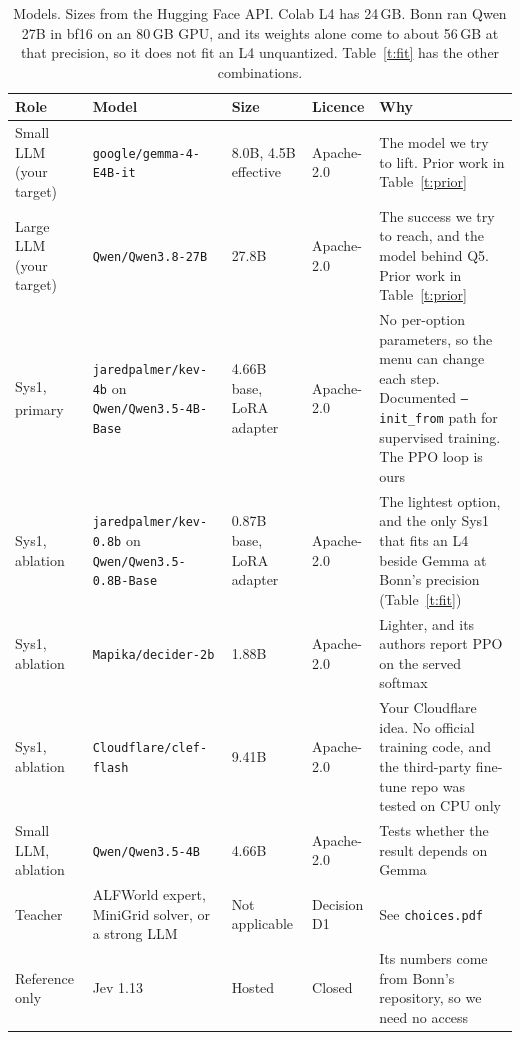 \documentclass[10pt]{article}
\newcommand{\my}{\textsuperscript{\textcolor{blue!70!black}{\dag}}}
\begin{document}
\begin{table}[H]
\footnotesize
\caption{Models. Sizes from the Hugging Face API. Colab L4 has 24\,GB. Bonn ran Qwen 27B in bf16 on an 80\,GB GPU, and its weights alone come to about 56\,GB at that precision, so it does not fit an L4 unquantized. Table~\ref{t:fit} has the other combinations.}
\label{t:models}
\begin{tabularx}{\linewidth}{@{}P{3.4cm} P{5.8cm} P{2.4cm} P{2.1cm} L@{}}
\toprule
Role & Model & Size & Licence & Why \\
\midrule
Small LLM (your target) & \texttt{google/gemma-4-E4B-it} & 8.0B, 4.5B effective & Apache-2.0 & The model we try to lift. Prior work in Table~\ref{t:prior} \\
Large LLM (your target) & \texttt{Qwen/Qwen3.8-27B} & 27.8B & Apache-2.0 & The success we try to reach, and the model behind Q5. Prior work in Table~\ref{t:prior} \\
Sys1, primary\my & \texttt{jaredpalmer/kev-4b} on \texttt{Qwen/Qwen3.5-4B-Base} & 4.66B base, LoRA adapter & Apache-2.0 & No per-option parameters, so the menu can change each step. Documented \texttt{--init\_from} path for supervised training. The PPO loop is ours \\
Sys1, ablation & \texttt{jaredpalmer/kev-0.8b} on \texttt{Qwen/Qwen3.5-0.8B-Base} & 0.87B base, LoRA adapter & Apache-2.0 & The lightest option, and the only Sys1 that fits an L4 beside Gemma at Bonn's precision (Table~\ref{t:fit}) \\
Sys1, ablation & \texttt{Mapika/decider-2b} & 1.88B & Apache-2.0 & Lighter, and its authors report PPO on the served softmax \\
Sys1, ablation & \texttt{Cloudflare/clef-flash} & 9.41B & Apache-2.0 & Your Cloudflare idea. No official training code, and the third-party fine-tune repo was tested on CPU only \\
Small LLM, ablation & \texttt{Qwen/Qwen3.5-4B} & 4.66B & Apache-2.0 & Tests whether the result depends on Gemma \\
Teacher & ALFWorld expert, MiniGrid solver, or a strong LLM & Not applicable & Decision D1 & See \texttt{choices.pdf} \\
Reference only & Jev 1.13 & Hosted & Closed & Its numbers come from Bonn's repository, so we need no access \\
\bottomrule
\end{tabularx}
\end{table}
\end{document}
